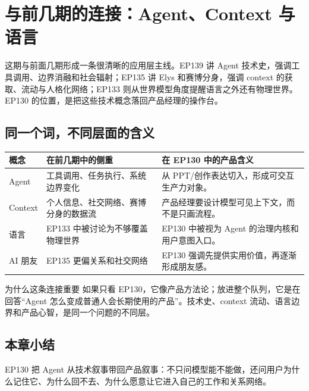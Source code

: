 \section{与前几期的连接：Agent、Context 与语言}

这期与前面几期形成一条很清晰的应用层主线。EP139 讲 Agent 技术史，强调工具调用、边界消融和社会辐射；EP135 讲 Elys 和赛博分身，强调 context 的获取、流动与人格化网络；EP133 则从世界模型角度提醒语言之外还有物理世界。EP130 的位置，是把这些技术概念落回产品经理的操作台。

\subsection{同一个词，不同层面的含义}

\begin{longtable}{p{}p{}p{}}
\toprule
概念 & 在前几期中的侧重 & 在 EP130 中的产品含义 \\
\midrule
Agent & 工具调用、任务执行、系统边界变化 & 从 PPT/创作表达切入，形成可交互生产力对象。 \\
Context & 个人信息、社交网络、赛博分身的数据流 & 产品经理要设计模型可见上下文，而不是只画流程。 \\
语言 & EP133 中被讨论为不够覆盖物理世界 & EP130 中被视为 Agent 的治理内核和用户意图入口。 \\
AI 朋友 & EP135 更偏关系和社交网络 & EP130 强调先提供实用价值，再逐渐形成朋友感。 \\
\bottomrule
\end{longtable}

\begin{knowledgebox}{为什么这条连接重要}
如果只看 EP130，它像产品方法论；放进整个队列，它是在回答“Agent 怎么变成普通人会长期使用的产品”。技术史、context 流动、语言边界和产品心智，是同一个问题的不同层。
\end{knowledgebox}

\subsection{本章小结}

EP130 把 Agent 从技术叙事带回产品叙事：不只问模型能不能做，还问用户为什么记住它、为什么回不去、为什么愿意让它进入自己的工作和关系网络。


